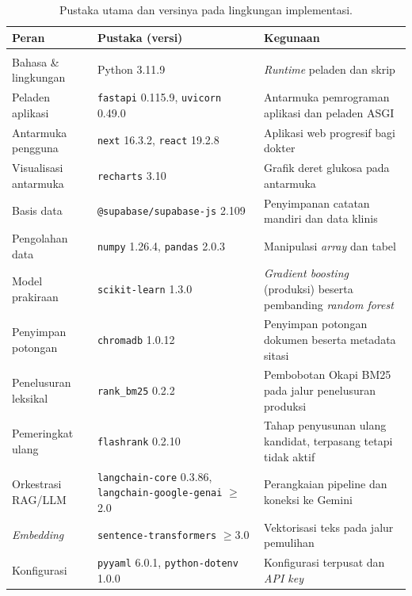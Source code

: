 \begin{table}[htbp]
\centering
\caption{Pustaka utama dan versinya pada lingkungan implementasi.}
\label{tab:dependensi}
\small
\begin{tabular}{@{}>{\raggedright\arraybackslash}p{2.9cm}>{\raggedright\arraybackslash}p{4.0cm}>{\raggedright\arraybackslash}p{5.1cm}@{}}
\toprule
\textbf{Peran} & \textbf{Pustaka (versi)} & \textbf{Kegunaan} \\
\midrule
\multicolumn{3}{@{}l}{\emph{Jalur layanan} (\texttt{requirements.txt} dan \texttt{backend/requirements.txt})} \\[3pt]
Bahasa \& lingkungan & Python 3.11.9 & \emph{Runtime} peladen dan skrip \\[2pt]
Peladen aplikasi & \texttt{fastapi} 0.115.9, \texttt{uvicorn} 0.49.0 & Antarmuka pemrograman aplikasi dan peladen ASGI \\[2pt]
Antarmuka pengguna & \texttt{next} 16.3.2, \texttt{react} 19.2.8 & Aplikasi web progresif bagi dokter \\[2pt]
Visualisasi antarmuka & \texttt{recharts} 3.10 & Grafik deret glukosa pada antarmuka \\[2pt]
Basis data & \texttt{@supabase/\allowbreak supabase-\allowbreak js} 2.109 & Penyimpanan catatan mandiri dan data klinis \\[2pt]
Pengolahan data & \texttt{numpy} 1.26.4, \texttt{pandas} 2.0.3 & Manipulasi \emph{array} dan tabel \\[2pt]
Model prakiraan & \texttt{scikit-learn} 1.3.0 & \emph{Gradient boosting} (produksi) beserta pembanding \emph{random forest} \\[2pt]
Penyimpan potongan & \texttt{chromadb} 1.0.12 & Penyimpan potongan dokumen beserta metadata sitasi \\[2pt]
Penelusuran leksikal & \texttt{rank\_\allowbreak bm25} 0.2.2 & Pembobotan Okapi BM25 pada jalur penelusuran produksi \\[2pt]
Pemeringkat ulang & \texttt{flashrank} 0.2.10 & Tahap penyusunan ulang kandidat, terpasang tetapi tidak aktif \\[2pt]
Orkestrasi RAG/LLM & \texttt{langchain-\allowbreak core} 0.3.86, \texttt{langchain-\allowbreak google-\allowbreak genai} $\ge$2.0 & Perangkaian pipeline dan koneksi ke Gemini \\[2pt]
\emph{Embedding} & \texttt{sentence-\allowbreak transformers} $\ge$3.0 & Vektorisasi teks pada jalur pemulihan \\[2pt]
Konfigurasi & \texttt{pyyaml} 6.0.1, \texttt{python-\allowbreak dotenv} 1.0.0 & Konfigurasi terpusat dan \emph{API key} \\[5pt]


\end{tabular}
\end{table}
